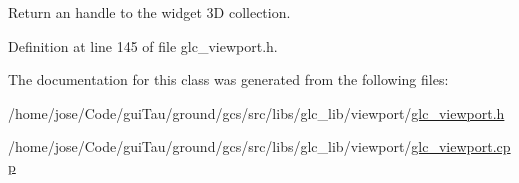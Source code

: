 Return an handle to the widget 3\-D collection. 



Definition at line 145 of file glc\-\_\-viewport.\-h.



The documentation for this class was generated from the following files\-:\begin{DoxyCompactItemize}
\item 
/home/jose/\-Code/gui\-Tau/ground/gcs/src/libs/glc\-\_\-lib/viewport/\hyperlink{glc__viewport_8h}{glc\-\_\-viewport.\-h}\item 
/home/jose/\-Code/gui\-Tau/ground/gcs/src/libs/glc\-\_\-lib/viewport/\hyperlink{glc__viewport_8cpp}{glc\-\_\-viewport.\-cpp}\end{DoxyCompactItemize}
